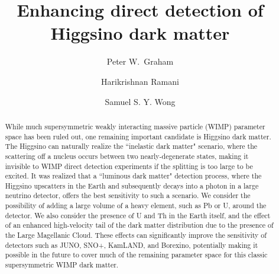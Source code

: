 \documentclass[aps,prd,amsmath,amssymb,10pt,letterpaper,balancelastpage,showpacs,superscriptaddress,nofootinbib,floatfix,notitlepage,longbibliography,twocolumn
]{revtex4-2}
\begin{document}
\title{Enhancing direct detection of Higgsino dark matter}
\author{Peter W.~Graham}
\author{Harikrishnan Ramani}
\author{Samuel S. Y. Wong}



\begin{abstract} %

While much supersymmetric weakly interacting massive particle (WIMP) parameter space has been ruled out, one remaining important candidate is Higgsino dark matter.
The Higgsino can naturally realize the ``inelastic dark matter" scenario, where the scattering off a nucleus occurs between two nearly-degenerate states, making it invisible to WIMP direct detection experiments if the splitting is too large to be excited.
It was realized that a ``luminous dark matter" detection process, where the Higgsino upscatters in the Earth and subsequently decays into a photon in a large neutrino detector, offers the best sensitivity to such a scenario.
We consider the possibility of adding a large volume of a heavy element, such as Pb or U, around the detector.
We also consider the presence of U and Th in the Earth itself, and the effect of an enhanced high-velocity tail of the dark matter distribution due to the presence of the Large Magellanic Cloud.
These effects can significantly improve the sensitivity of detectors such as JUNO, SNO+, KamLAND, and Borexino, potentially making it possible in the future to cover much of the remaining parameter space for this classic supersymmetric WIMP dark matter.
\end{abstract}

\maketitle
\end{document}

